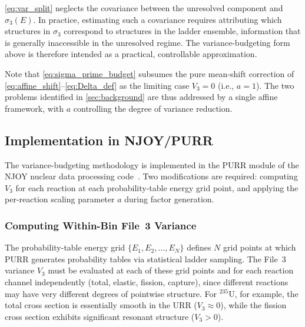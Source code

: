 \documentclass{style/nseJournal}
\newcommand{\isotope}[2]{\ensuremath{^{#1}\mathrm{#2}}}
\begin{document}
\autoref{eq:var_split} neglects the covariance between the unresolved component and $\sigma_3(E)$. In practice, estimating such a covariance requires attributing which structures in $\sigma_3$ correspond to structures in the ladder ensemble, information that is generally inaccessible in the unresolved regime. The variance-budgeting form above is therefore intended as a practical, controllable approximation.

Note that \autoref{eq:sigma_prime_budget} subsumes the pure mean-shift correction of \autoref{eq:affine_shift}--\autoref{eq:Delta_def} as the limiting case $V_3 = 0$ (i.e., $a = 1$). The two problems identified in \autoref{sec:background} are thus addressed by a single affine framework, with $a$ controlling the degree of variance reduction.

\subsection{Implementation in NJOY/PURR}
\label{ssec:njoy-implementation}

The variance-budgeting methodology is implemented in the PURR module of the NJOY nuclear data processing code~\cite{njoy}. Two modifications are required: computing $V_3$ for each reaction at each probability-table energy grid point, and applying the per-reaction scaling parameter $a$ during factor generation.

\subsubsection{Computing Within-Bin File~3 Variance}
\label{sssec:compute-v3}

The probability-table energy grid $\{E_1, E_2, \ldots, E_N\}$ defines $N$ grid points at which PURR generates probability tables via statistical ladder sampling. The File~3 variance $V_3$ must be evaluated at each of these grid points and for each reaction channel independently (total, elastic, fission, capture), since different reactions may have very different degrees of pointwise structure. For \isotope{235}{U}, for example, the total cross section is essentially smooth in the URR ($V_3\approx 0$), while the fission cross section exhibits significant resonant structure ($V_3 > 0$).
\end{document}
